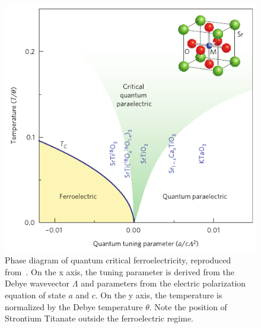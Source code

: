\documentclass{thesis-umich}
\begin{document}
\begin{figure}
	\centering
	\caption[Quantum Critical Ferroelectric Phase Diagram]{Phase diagram of quantum critical ferroelectricity, reproduced from~\cite{Rowley2014}. On the x axis, the tuning parameter is derived from the Debye wavevector $\Lambda$ and parameters from the electric polarization equation of state $a$ and $c$. On the y axis, the temperature is normalized by the Debye temperature $\theta$. Note the position of Strontium Titanate outside the ferroelectric regime.}
	\label{fig:qc_rowley}
	\includegraphics[width=0.8\columnwidth]{figures/sto_phasedia_rowley.pdf}
\end{figure}
\end{document}
